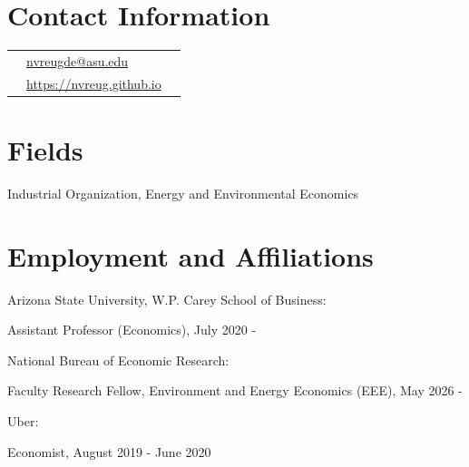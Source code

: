 \documentclass[margin,line]{res}
\newenvironment{list1}{
  \begin{list}{\ding{113}}{%
      \setlength{\itemsep}{.025in}
      \setlength{\parsep}{0in} \setlength{\parskip}{0in}
      \setlength{\topsep}{0in} \setlength{\partopsep}{0in}
      \setlength{\leftmargin}{0.17in}}}{\end{list}}
\begin{document}


\begin{resume}
\thispagestyle{plain} %

\section{ Contact Information}
\vspace{.05in}
\begin{tabular}{@{}p{0.20in}p{2.75in}p{2.75in}}
 &  \href{mailto: nvreugde@asu.edu}{nvreugde@asu.edu}   & \\
 &\href{https://nvreug.github.io}{https://nvreug.github.io} & \\ 
\end{tabular}

\section{ Fields}
\begin{list1}
\item[] Industrial Organization, Energy and Environmental Economics
\vspace*{.05in}
\end{list1}

\section{ Employment and Affiliations}
\begin{list1}
	\item[] Arizona State University, W.P. Carey School of Business:
	\item[] \hspace{11pt} Assistant Professor (Economics), July 2020 -
	\item[] National Bureau of Economic Research:
	\item[] \hspace{11pt} Faculty Research Fellow, Environment and Energy Economics (EEE), May 2026 -
	\item[] Uber:
	\item[] \hspace{11pt} Economist, August 2019 - June 2020
	\vspace*{.05in}
\end{list1}


\end{resume}
\end{document}

